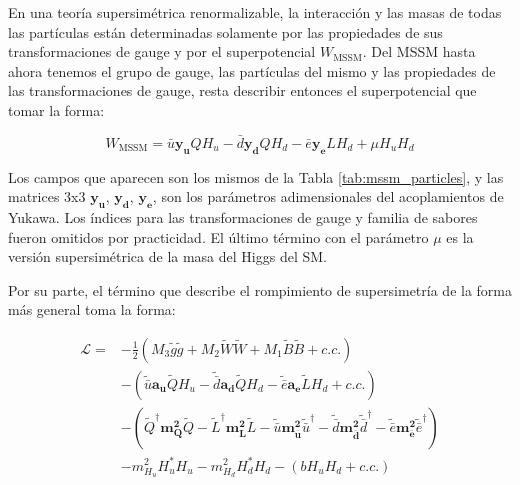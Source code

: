 En una teoría supersimétrica renormalizable, la interacción y las masas de todas las partículas están determinadas solamente por las propiedades de sus transformaciones de gauge y por el superpotencial $W_{\text{MSSM}}$. Del MSSM hasta ahora tenemos el grupo de gauge, las partículas del mismo y las propiedades de las transformaciones de gauge, resta describir entonces el superpotencial que tomar la forma:

\begin{equation}
	W_{\text{MSSM}} = \bar{u}\textbf{y}_\textbf{u}QH_u - \bar{d}\textbf{y}_\textbf{d}QH_d - \bar{e}\textbf{y}_\textbf{e}LH_d + \mu H_u H_d
	\label{eq:susy_potential}
\end{equation}

Los campos que aparecen son los mismos de la Tabla \ref{tab:mssm_particles}, y las matrices 3x3 $\textbf{y}_\textbf{u}$, $\textbf{y}_\textbf{d}$, $\textbf{y}_\textbf{e}$, son los parámetros adimensionales del acoplamientos de Yukawa. Los índices para las transformaciones de gauge y familia de sabores fueron omitidos por practicidad. El último término con el parámetro $\mu$ es la versión supersimétrica de la masa del Higgs del SM.

Por su parte, el término que describe el rompimiento de supersimetría de la forma más general toma la forma:

\begin{equation}
	\begin{split}
		\mathcal{L} = & -\frac{1}{2}\left( M_3 \tilde{g}\tilde{g} + M_2 \widetilde{W}\widetilde{W} + M_1 \widetilde{B}\widetilde{B} + c.c. \right) \\
			& - \left( \tilde{\bar{u}}\textbf{a}_\textbf{u}\widetilde{Q}H_u -  \tilde{\bar{d}}\textbf{a}_\textbf{d}\widetilde{Q}H_d -  \tilde{\bar{e}}\textbf{a}_\textbf{e}\widetilde{L}H_d + c.c. \right) \\
			& - \left( \tilde{Q}^{\dagger} \textbf{m}_{\textbf{Q}}^{\textbf{2}}\tilde{Q} - \tilde{L}^{\dagger}\textbf{m}_{\textbf{L}}^{\textbf{2}}\tilde{L} - \tilde{\bar{u}}\textbf{m}_{\bar{\textbf{u}}}^{\textbf{2}}\tilde{\bar{u}}^{\dagger} - \tilde{\bar{d}}\textbf{m}_{\bar{\textbf{d}}}^{\textbf{2}}\tilde{\bar{d}}^{\dagger} - \tilde{\bar{e}}\textbf{m}_{\bar{\textbf{e}}}^{\textbf{2}}\tilde{\bar{e}}^{\dagger} \right) \\
			& - m_{H_u}^2 H_u^* H_u - m_{H_d}^2 H_d^* H_d - (b H_u H_d + c.c.) \\
	\end{split}
\end{equation}

